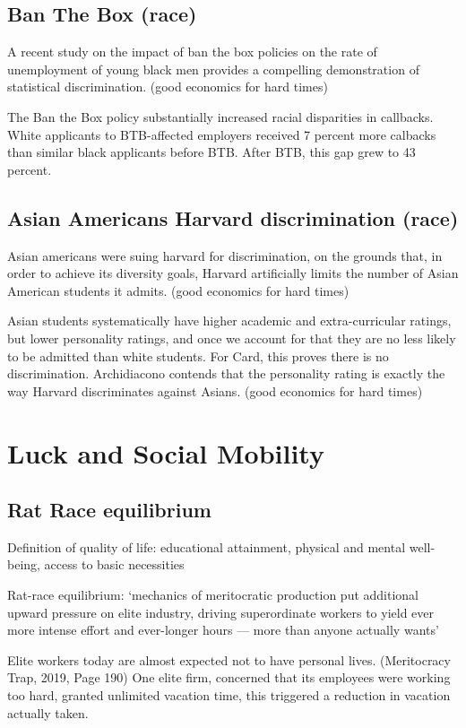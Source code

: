 \documentclass[11pt]{article}
\begin{document}
\subsection{Ban The Box (race)}
A recent study on the impact of ban the box policies on the rate of unemployment of young black men provides a compelling demonstration of statistical discrimination. (good economics for hard times)

The Ban the Box policy substantially increased racial disparities in callbacks. White applicants to BTB-affected employers received 7 percent more calbacks than similar black applicants before BTB. After BTB, this gap grew to 43 percent.

\subsection{Asian Americans Harvard discrimination (race)}
Asian americans were suing harvard for discrimination, on the grounds that, in order to achieve its diversity goals, Harvard  artificially limits the number of Asian American students it admits. (good economics for hard times)

Asian students systematically have higher academic and extra-curricular ratings, but lower personality ratings, and once we account for that they are no less likely to be admitted than white students. For Card, this proves there is no discrimination. Archidiacono contends that the personality rating is exactly the way Harvard discriminates against Asians. (good economics for hard times)
\section{Luck and Social Mobility}
\subsection{Rat Race equilibrium}

Definition of quality of life: educational attainment, physical and mental well-being, access to basic necessities

Rat-race equilibrium: ‘mechanics of meritocratic production put additional upward pressure on elite industry, driving superordinate workers  to yield ever more intense effort and ever-longer hours — more than anyone actually wants’

Elite workers today are almost expected not to have personal lives. (Meritocracy Trap, 2019, Page 190) One elite firm, concerned that its employees were working too hard, granted unlimited vacation time, this triggered a reduction in vacation actually taken.
\end{document}
